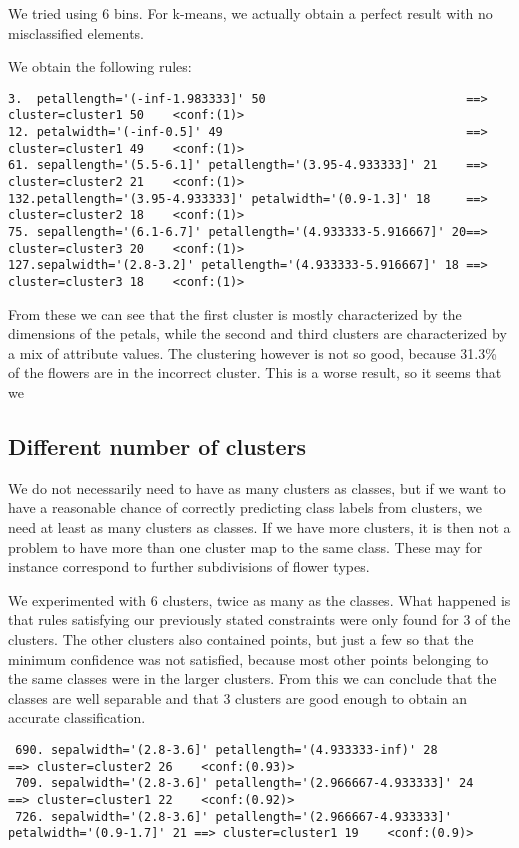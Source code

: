 \documentclass[]{article}
\begin{document}
We tried using 6 bins. For k-means, we actually obtain a perfect result with no misclassified elements.

We obtain the following rules:
\begin{lstlisting}
3. 	petallength='(-inf-1.983333]' 50 							==> cluster=cluster1 50    <conf:(1)>
12. petalwidth='(-inf-0.5]' 49 									==> cluster=cluster1 49    <conf:(1)> 
61. sepallength='(5.5-6.1]' petallength='(3.95-4.933333]' 21 	==> cluster=cluster2 21    <conf:(1)>
132.petallength='(3.95-4.933333]' petalwidth='(0.9-1.3]' 18 	==> cluster=cluster2 18    <conf:(1)> 
75. sepallength='(6.1-6.7]' petallength='(4.933333-5.916667]' 20==> cluster=cluster3 20    <conf:(1)>
127.sepalwidth='(2.8-3.2]' petallength='(4.933333-5.916667]' 18 ==> cluster=cluster3 18    <conf:(1)>
\end{lstlisting}
From these we can see that the first cluster is mostly characterized by the dimensions of the petals, while the second and third clusters are characterized by a mix of attribute values. The clustering however is not so good, because 31.3\% of the flowers are in the incorrect cluster. This is a worse result, so it seems that we 

\subsection{Different number of clusters}
We do not necessarily need to have as many clusters as classes, but if we want to have a reasonable chance of correctly predicting class labels from clusters, we need at least as many clusters as classes. If we have more clusters, it is then not a problem to have more than one cluster map to the same class. These may for instance correspond to further subdivisions of flower types. 

We experimented with 6 clusters, twice as many as the classes. What happened is that rules satisfying our previously stated constraints were only found for 3 of the clusters. The other clusters also contained points, but just a few so that the minimum confidence was not satisfied, because most other points belonging to the same classes were in the larger clusters. From this we can conclude that the classes are well separable and that 3 clusters are good enough to obtain an accurate classification.

\begin{lstlisting}
 690. sepalwidth='(2.8-3.6]' petallength='(4.933333-inf)' 28 		==> cluster=cluster2 26    <conf:(0.93)>
 709. sepalwidth='(2.8-3.6]' petallength='(2.966667-4.933333]' 24 	==> cluster=cluster1 22    <conf:(0.92)> 
 726. sepalwidth='(2.8-3.6]' petallength='(2.966667-4.933333]' petalwidth='(0.9-1.7]' 21 ==> cluster=cluster1 19    <conf:(0.9)>
\end{lstlisting}
\end{document}
